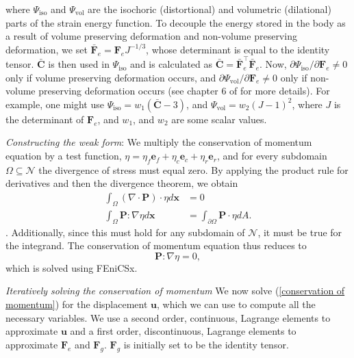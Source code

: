 where $\Psi_\text{iso}$ and $\Psi_\text{vol}$ are the isochoric (distortional) and volumetric (dilational) parts of the strain energy function. To decouple the energy stored in the body as a result of volume preserving deformation and non-volume preserving deformation, we set $\mathbf{\bar{F}}_e = \mathbf{F}_eJ^{-1/3}$, whose determinant is equal to the identity tensor. $\mathbf{\bar{C}}$ is then used in $\Psi_\text{iso}$ and is calculated as $\mathbf{\bar{C}} = \mathbf{\bar{F}}_e^\top \mathbf{\bar{F}}_e$. Now, $\partial\Psi_\text{iso}/\partial \mathbf{F}_e \neq 0$ only if volume preserving deformation occurs, and $\partial\Psi_\text{vol}/\partial \mathbf{F}_e \neq 0$ only if non-volume preserving deformation occurs (see chapter 6 of \cite{Holzapfel2002} for more details). For example, one might use $\Psi_\text{iso} = w_1\left(\mathbf{\bar{C}} - 3\right)$, and $\Psi_\text{vol} = w_2(J-1)^2$, where $J$ is the determinant of $\mathbf{F}_e$, and $w_1$, and $w_2$ are some scalar values. \par
\emph{Constructing the weak form}: We multiply the conservation of momentum equation by a test function, $\eta =  \eta_f\mathbf{e}_f + \eta_c\mathbf{e}_c + \eta_r\mathbf{e}_r$, and for every subdomain $\Omega \subseteq \mathcal{N}$ the divergence of stress must equal zero. By applying the product rule for derivatives and then the divergence theorem, we obtain
\begin{align*}
    \int_\Omega(\nabla\cdot\mathbf{P})\cdot\eta d\mathbf{x} &= 0 \\
    \int_\Omega \mathbf{P} : \nabla\eta d\mathbf{x} &= \int_{\partial\Omega}\mathbf{P}\cdot\eta dA.
\end{align*}
. Additionally, since this must hold for any subdomain of $\mathcal{N}$, it must be true for the integrand. The conservation of momentum equation thus reduces to
\begin{equation}
\label{conservation of momentum}
    \mathbf{P} : \nabla\eta = 0,
\end{equation}
which is solved using FEniCSx.
\par
\emph{Iteratively solving the conservation of momentum}
We now solve (\ref{conservation of momentum}) for the displacement $\mathbf{u}$, which we can use to compute all the necessary variables. We use a second order, continuous, Lagrange elements to approximate $\mathbf{u}$ and a first order, discontinuous, Lagrange elements to approximate $\mathbf{F}_e$ and $\mathbf{F}_g$. $\mathbf{F}_g$ is initially set to be the identity tensor. \par

